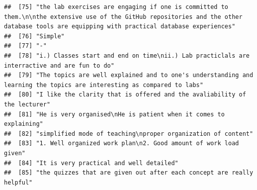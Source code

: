 \documentclass[
]{article}
\begin{document}
\begin{verbatim}
##  [75] "the lab exercises are engaging if one is committed to them.\n\nthe extensive use of the GitHub repositories and the other database tools are equipping with practical database experiences"                                                       
##  [76] "Simple"                                                                                                                                                                                                                                           
##  [77] "-"                                                                                                                                                                                                                                                
##  [78] "i.) Classes start and end on time\nii.) Lab practiclals are interractive and are fun to do"                                                                                                                                                       
##  [79] "The topics are well explained and to one's understanding and learning the topics are interesting as compared to labs"                                                                                                                             
##  [80] "I like the clarity that is offered and the avaliability of the lecturer"                                                                                                                                                                          
##  [81] "He is very organised\nHe is patient when it comes to explaining"                                                                                                                                                                                  
##  [82] "simplified mode of teaching\nproper organization of content"                                                                                                                                                                                      
##  [83] "1. Well organized work plan\n2. Good amount of work load given"                                                                                                                                                                                   
##  [84] "It is very practical and well detailed"                                                                                                                                                                                                           
##  [85] "the quizzes that are given out after each concept are really helpful"                                                                                                                                                                             

\end{verbatim}
\end{document}
